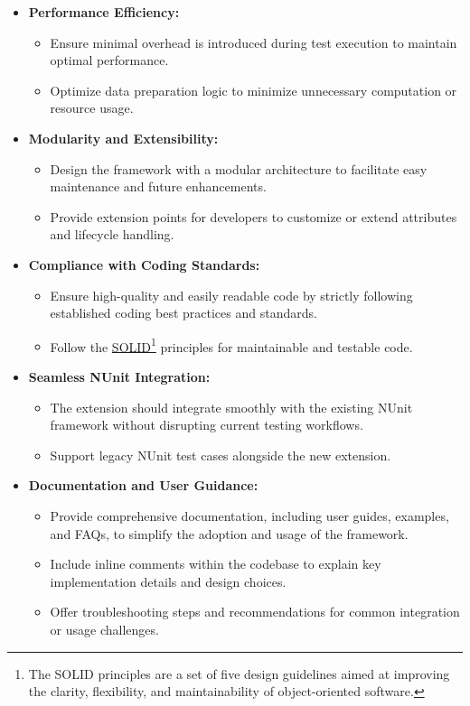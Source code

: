 \begin{itemize}
	\item \textbf{Performance Efficiency:}
	      \begin{itemize}
		      \item Ensure minimal overhead is introduced during test execution to maintain optimal performance.
		      \item Optimize data preparation logic to minimize unnecessary computation or resource usage.
	      \end{itemize}

	\item \textbf{Modularity and Extensibility:}
	      \begin{itemize}
		      \item Design the framework with a modular architecture to facilitate easy maintenance and future enhancements.
		      \item Provide extension points for developers to customize or extend attributes and lifecycle handling.
	      \end{itemize}

	\item \textbf{Compliance with Coding Standards:}
	      \begin{itemize}
		      \item Ensure high-quality and easily readable code by strictly following established coding best practices and standards.
		      \item Follow the \href{https://en.wikipedia.org/wiki/SOLID}{SOLID}\footnote{The SOLID principles are a set of five design guidelines aimed at improving the clarity, flexibility, and maintainability of object-oriented software.} principles for maintainable and testable code.
	      \end{itemize}

	\item \textbf{Seamless NUnit Integration:}
	      \begin{itemize}
		      \item The extension should integrate smoothly with the existing NUnit framework without disrupting current testing workflows.
		      \item Support legacy NUnit test cases alongside the new extension.
	      \end{itemize}
	\item \textbf{Documentation and User Guidance:}
	      \begin{itemize}
		      \item Provide comprehensive documentation, including user guides, examples, and FAQs, to simplify the adoption and usage of the framework.
		      \item Include inline comments within the codebase to explain key implementation details and design choices.
		      \item Offer troubleshooting steps and recommendations for common integration or usage challenges.
	      \end{itemize}
\end{itemize}

